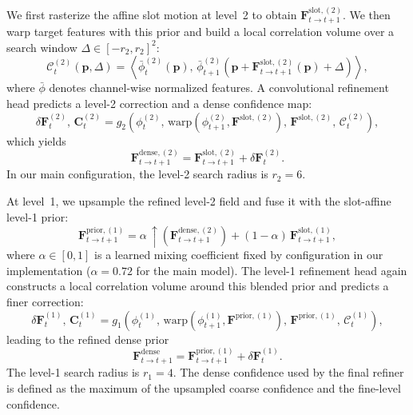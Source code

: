 We first rasterize the affine slot motion at level~2 to obtain $\mathbf{F}^{\mathrm{slot},(2)}_{t\rightarrow t+1}$. We then warp target features with this prior and build a local correlation volume over a search window $\Delta \in [-r_2,r_2]^2$:
\begin{equation}
\label{eq:l2_corr}
\mathcal{C}_t^{(2)}(\mathbf{p},\Delta) = \left\langle \bar{\phi}_t^{(2)}(\mathbf{p}),\, \bar{\phi}_{t+1}^{(2)}\left(\mathbf{p} + \mathbf{F}^{\mathrm{slot},(2)}_{t\rightarrow t+1}(\mathbf{p}) + \Delta\right) \right\rangle,
\end{equation}
where $\bar{\phi}$ denotes channel-wise normalized features. A convolutional refinement head predicts a level-2 correction and a dense confidence map:
\begin{equation}
\delta \mathbf{F}_t^{(2)},\, \mathbf{C}_t^{(2)} = g_2\left(\phi_t^{(2)},\, \mathrm{warp}(\phi_{t+1}^{(2)},\mathbf{F}^{\mathrm{slot},(2)}),\, \mathbf{F}^{\mathrm{slot},(2)},\, \mathcal{C}_t^{(2)}\right),
\end{equation}
which yields
\begin{equation}
\mathbf{F}^{\mathrm{dense},(2)}_{t\rightarrow t+1} = \mathbf{F}^{\mathrm{slot},(2)}_{t\rightarrow t+1} + \delta \mathbf{F}_t^{(2)}.
\end{equation}
In our main configuration, the level-2 search radius is $r_2=6$.

At level~1, we upsample the refined level-2 field and fuse it with the slot-affine level-1 prior:
\begin{equation}
\label{eq:prior_blend}
\mathbf{F}^{\mathrm{prior},(1)}_{t\rightarrow t+1} = \alpha\,\uparrow\!\left(\mathbf{F}^{\mathrm{dense},(2)}_{t\rightarrow t+1}\right) + (1-\alpha)\,\mathbf{F}^{\mathrm{slot},(1)}_{t\rightarrow t+1},
\end{equation}
where $\alpha\in[0,1]$ is a learned mixing coefficient fixed by configuration in our implementation ($\alpha=0.72$ for the main model). The level-1 refinement head again constructs a local correlation volume around this blended prior and predicts a finer correction:
\begin{equation}
\delta \mathbf{F}_t^{(1)},\, \mathbf{C}_t^{(1)} = g_1\left(\phi_t^{(1)},\, \mathrm{warp}(\phi_{t+1}^{(1)},\mathbf{F}^{\mathrm{prior},(1)}),\, \mathbf{F}^{\mathrm{prior},(1)},\, \mathcal{C}_t^{(1)}\right),
\end{equation}
leading to the refined dense prior
\begin{equation}
\label{eq:dense_prior}
\mathbf{F}^{\mathrm{dense}}_{t\rightarrow t+1} = \mathbf{F}^{\mathrm{prior},(1)}_{t\rightarrow t+1} + \delta \mathbf{F}_t^{(1)}.
\end{equation}
The level-1 search radius is $r_1=4$. The dense confidence used by the final refiner is defined as the maximum of the upsampled coarse confidence and the fine-level confidence.

